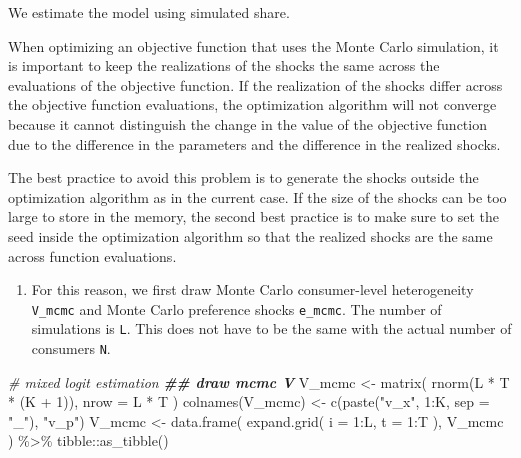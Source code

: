 \documentclass[
]{book}
\newenvironment{Shaded}{\begin{snugshade}}{\end{snugshade}}
\newcommand{\AttributeTok}[1]{\textcolor[rgb]{0.77,0.63,0.00}{#1}}
\newcommand{\CommentTok}[1]{\textcolor[rgb]{0.56,0.35,0.01}{\textit{#1}}}
\newcommand{\DecValTok}[1]{\textcolor[rgb]{0.00,0.00,0.81}{#1}}
\newcommand{\DocumentationTok}[1]{\textcolor[rgb]{0.56,0.35,0.01}{\textbf{\textit{#1}}}}
\newcommand{\FunctionTok}[1]{\textcolor[rgb]{0.00,0.00,0.00}{#1}}
\newcommand{\NormalTok}[1]{#1}
\newcommand{\OtherTok}[1]{\textcolor[rgb]{0.56,0.35,0.01}{#1}}
\newcommand{\SpecialCharTok}[1]{\textcolor[rgb]{0.00,0.00,0.00}{#1}}
\newcommand{\StringTok}[1]{\textcolor[rgb]{0.31,0.60,0.02}{#1}}
\providecommand{\tightlist}{%
  \setlength{\itemsep}{0pt}\setlength{\parskip}{0pt}}
\begin{document}
We estimate the model using simulated share.

When optimizing an objective function that uses the Monte Carlo simulation, it is important to keep the realizations of the shocks the same across the evaluations of the objective function. If the realization of the shocks differ across the objective function evaluations, the optimization algorithm will not converge because it cannot distinguish the change in the value of the objective function due to the difference in the parameters and the difference in the realized shocks.

The best practice to avoid this problem is to generate the shocks outside the optimization algorithm as in the current case. If the size of the shocks can be too large to store in the memory, the second best practice is to make sure to set the seed inside the optimization algorithm so that the realized shocks are the same across function evaluations.

\begin{enumerate}
\def\labelenumi{\arabic{enumi}.}
\setcounter{enumi}{1}
\tightlist
\item
  For this reason, we first draw Monte Carlo consumer-level heterogeneity \texttt{V\_mcmc} and Monte Carlo preference shocks \texttt{e\_mcmc}. The number of simulations is \texttt{L}. This does not have to be the same with the actual number of consumers \texttt{N}.
\end{enumerate}

\begin{Shaded}
\begin{Highlighting}[]
\CommentTok{\# mixed logit estimation}
\DocumentationTok{\#\# draw mcmc V}
\NormalTok{V\_mcmc }\OtherTok{\textless{}{-}} 
  \FunctionTok{matrix}\NormalTok{(}
    \FunctionTok{rnorm}\NormalTok{(L }\SpecialCharTok{*}\NormalTok{ T }\SpecialCharTok{*}\NormalTok{ (K }\SpecialCharTok{+} \DecValTok{1}\NormalTok{)), }
    \AttributeTok{nrow =}\NormalTok{ L }\SpecialCharTok{*}\NormalTok{ T}
\NormalTok{    ) }
\FunctionTok{colnames}\NormalTok{(V\_mcmc) }\OtherTok{\textless{}{-}} \FunctionTok{c}\NormalTok{(}\FunctionTok{paste}\NormalTok{(}\StringTok{"v\_x"}\NormalTok{, }\DecValTok{1}\SpecialCharTok{:}\NormalTok{K, }\AttributeTok{sep =} \StringTok{"\_"}\NormalTok{), }\StringTok{"v\_p"}\NormalTok{)}
\NormalTok{V\_mcmc }\OtherTok{\textless{}{-}} 
  \FunctionTok{data.frame}\NormalTok{(}
    \FunctionTok{expand.grid}\NormalTok{(}
      \AttributeTok{i =} \DecValTok{1}\SpecialCharTok{:}\NormalTok{L, }
      \AttributeTok{t =} \DecValTok{1}\SpecialCharTok{:}\NormalTok{T}
\NormalTok{      ),}
\NormalTok{    V\_mcmc}
\NormalTok{    ) }\SpecialCharTok{\%\textgreater{}\%}
\NormalTok{  tibble}\SpecialCharTok{::}\FunctionTok{as\_tibble}\NormalTok{() }
\end{Highlighting}
\end{Shaded}
\end{document}
